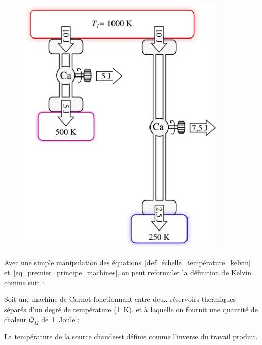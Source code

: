 		\begin{figure}
			\begin{center}
				\includegraphics[width=10cm]{images/echelle_temperature_kelvin.png}
			\end{center}
			\label{fig_échelle_température_kelvin}
		\end{figure}


		Avec une simple manipulation des équations~\ref{def_échelle_température_kelvin} et~\ref{eq_premier_principe_machines}, on peut reformuler la définition de Kelvin comme suit :

		\begin{trucimportant}
		Soit une machine de Carnot fonctionnant 
		entre deux réservoirs thermiques séparés d’un degré de température (\SI{1}{\kelvin}),\linebreak
		et à laquelle on fournit une quantité de chaleur $Q_{H}$ de~\SI{1}{Joule} ;

		La température de la source chaude\linebreak est définie comme l’inverse du travail produit.
		\end{trucimportant}

